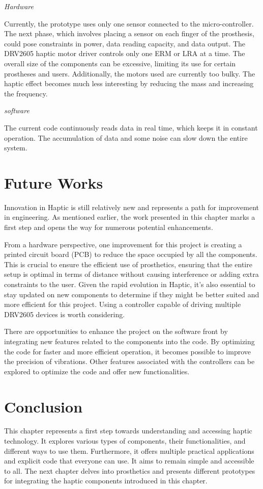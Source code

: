 \textit{Hardware}

Currently, the prototype uses only one sensor connected to the micro-controller. The next phase, which involves placing a sensor on each finger of the prosthesis, could pose constraints in power, data reading capacity, and data output. The DRV2605 haptic motor driver controls only one ERM or LRA at a time. The overall size of the components can be excessive, limiting its use for certain prostheses and users. Additionally, the motors used are currently too bulky. The haptic effect becomes much less interesting by reducing the mass and increasing the frequency.

\textit{software}

The current code continuously reads data in real time, which keeps it in constant operation. The accumulation of data and some noise can slow down the entire system.

\section{Future Works}
Innovation in Haptic is still relatively new and represents a path for improvement in engineering. As mentioned earlier, the work presented in this chapter marks a first step and opens the way for numerous potential enhancements.

From a hardware perspective, one improvement for this project is creating a printed circuit board (PCB) to reduce the space occupied by all the components. This is crucial to ensure the efficient use of prosthetics, ensuring that the entire setup is optimal in terms of distance without causing interference or adding extra constraints to the user. Given the rapid evolution in Haptic, it's also essential to stay updated on new components to determine if they might be better suited and more efficient for this project. Using a controller capable of driving multiple DRV2605 devices is worth considering.

There are opportunities to enhance the project on the software front by integrating new features related to the components into the code. By optimizing the code for faster and more efficient operation, it becomes possible to improve the precision of vibrations. Other features associated with the controllers can be explored to optimize the code and offer new functionalities.

\section{Conclusion}
This chapter represents a first step towards understanding and accessing haptic technology. It explores various types of components, their functionalities, and different ways to use them. Furthermore, it offers multiple practical applications and explicit code that everyone can use. It aims to remain simple and accessible to all. The next chapter delves into prosthetics and presents different prototypes for integrating the haptic components introduced in this chapter.